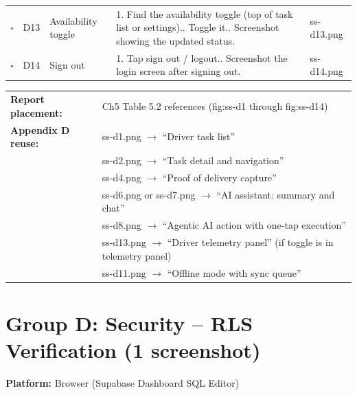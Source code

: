 \documentclass[11pt,a4paper]{article}
\newcommand{\checkbox}{$\square$\;}
\newcommand{\filesave}[1]{{\ttfamily\small #1}}
\begin{document}
\begin{longtable}{@{}p{0.4cm} p{0.6cm} p{2.5cm} p{5.5cm} p{3.0cm}@{}}
  \checkbox & D13 & Availability toggle &
    1. Find the availability toggle (top of task list or settings).\newline
    2. Toggle it.\newline
    3. Screenshot showing the updated status. &
    \filesave{ss-d13.png} \\[6pt]

  \checkbox & D14 & Sign out &
    1. Tap sign out / logout.\newline
    2. Screenshot the login screen after signing out. &
    \filesave{ss-d14.png} \\
  \bottomrule
\end{longtable}

\medskip
\begin{tabular}{@{}lp{12cm}@{}}
  \textbf{Report placement:} & Ch5 Table 5.2 references (fig:ss-d1 through fig:ss-d14) \\
  \textbf{Appendix D reuse:} & ss-d1.png $\to$ ``Driver task list'' \\
                              & ss-d2.png $\to$ ``Task detail and navigation'' \\
                              & ss-d4.png $\to$ ``Proof of delivery capture'' \\
                              & ss-d6.png or ss-d7.png $\to$ ``AI assistant: summary and chat'' \\
                              & ss-d8.png $\to$ ``Agentic AI action with one-tap execution'' \\
                              & ss-d13.png $\to$ ``Driver telemetry panel'' (if toggle is in telemetry panel) \\
                              & ss-d11.png $\to$ ``Offline mode with sync queue'' \\
\end{tabular}

\section{Group D: Security -- RLS Verification (1 screenshot)}

\textbf{Platform:} Browser (Supabase Dashboard SQL Editor)
\end{document}
